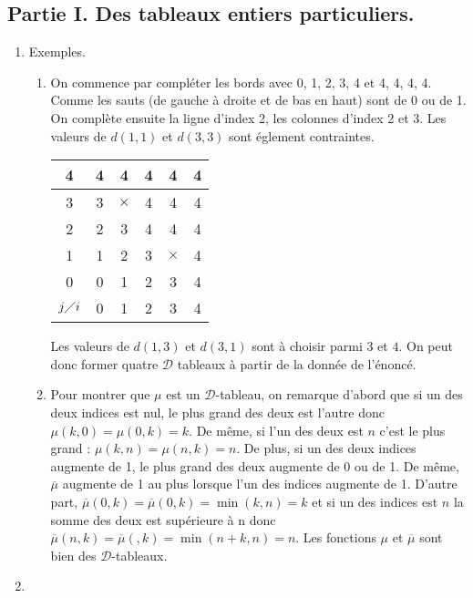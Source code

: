\subsection*{Partie I. Des tableaux entiers particuliers.}
\begin{enumerate}
  \item Exemples.
\begin{enumerate}
  \item On commence par compléter les bords avec 0, 1, 2, 3, 4 et 4, 4, 4, 4. Comme les sauts (de gauche à droite et de bas en haut) sont de 0 ou de 1. On complète ensuite la ligne d'index 2, les colonnes d'index 2 et 3. Les valeurs de $d(1,1)$ et $d(3,3)$ sont églement contraintes.
\begin{center}
\renewcommand {\arraystretch} {1.2}
\begin{tabular}{c|c|c|c|c|c|}
4            & 4 & 4 & 4 & 4 & 4 \\ \hline
3            & 3 & $×$ & 4 & 4 & 4 \\ \hline
2            & 2 & 3 & 4   & 4 & 4 \\ \hline
1            & 1 & 2 & 3 & $×$ & 4 \\ \hline
0            & 0 & 1 & 2 & 3 & 4 \\ \hline
$j\diagup i$ & 0   & 1   & 2   & 3   & 4
\end{tabular}
\end{center}
\medskip 
Les valeurs de $d(1,3)$ et $d(3,1)$ sont à choisir parmi $3$ et $4$. On peut donc former quatre $\mathcal{D}$ tableaux à partir de la donnée de l'énoncé.
  \item Pour montrer que $\mu$ est un $\mathcal{D}$-tableau, on remarque d'abord que si un des deux indices est nul, le plus grand des deux est l'autre donc $\mu(k,0)=\mu(0,k)=k$. De même, si l'un des deux est $n$ c'est le plus grand : $\mu(k,n)=\mu(n,k)=n$. De plus, si un des deux indices augmente de 1, le plus grand des deux augmente de 0 ou de 1.\newline
  De même, $\overline{\mu}$ augmente de 1 au plus lorsque l'un des indices augmente de 1. D'autre part, $\overline{\mu}(0,k)=\overline{\mu}(0,k)=\min(k,n)=k$ et si un des indices est $n$ la somme des deux est supérieure à n donc $\overline{\mu}(n,k)=\overline{\mu}(,k)=\min(n+k,n)=n$.\newline
  Les fonctions $\mu$ et $\overline{\mu}$ sont bien des $\mathcal{D}$-tableaux.
\end{enumerate}
\item
\begin{enumerate}

\end{enumerate}
\end{enumerate}
